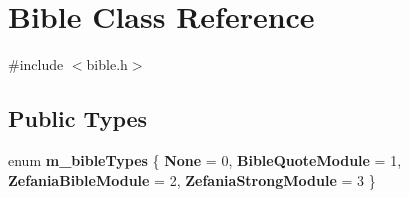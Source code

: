 \hypertarget{classBible}{
\section{Bible Class Reference}
\label{classBible}
}


{\ttfamily \#include $<$bible.h$>$}\subsection*{Public Types}
\begin{DoxyCompactItemize}
\item 
enum {\bfseries m\_\-bibleTypes} \{ {\bfseries None} =  0, 
{\bfseries BibleQuoteModule} =  1, 
{\bfseries ZefaniaBibleModule} =  2, 
{\bfseries ZefaniaStrongModule} =  3
 \}
\end{DoxyCompactItemize}
